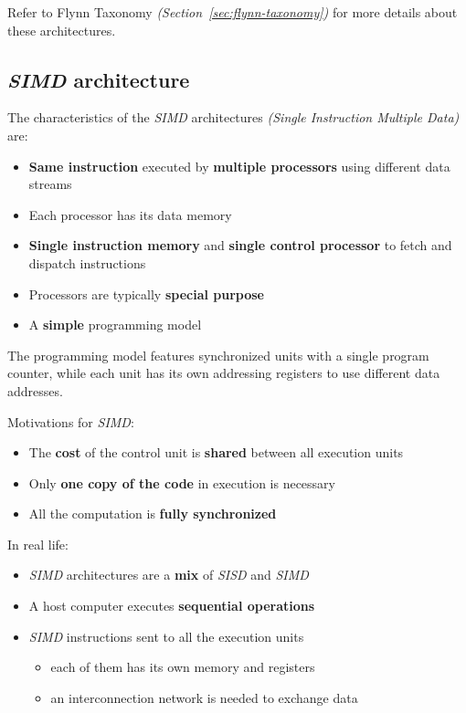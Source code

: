 \documentclass[english]{article}
\begin{document}
Refer to Flynn Taxonomy \textit{(Section~\ref{sec:flynn-taxonomy})} for more details about these architectures.

\subsection{\textit{SIMD} architecture}

The characteristics of the \textit{SIMD} architectures \textit{(Single Instruction Multiple Data)} are:

\begin{itemize}
  \item \textbf{Same instruction} executed by \textbf{multiple processors} using different data streams
  \item Each processor has its data memory
  \item \textbf{Single instruction memory} and \textbf{single control processor} to fetch and dispatch instructions
  \item Processors are typically \textbf{special purpose}
  \item A \textbf{simple} programming model
\end{itemize}

The programming model features synchronized units with a single program counter, while each unit has its own addressing registers to use different data addresses.

\bigskip
Motivations for \textit{SIMD}:

\begin{itemize}
  \item The \textbf{cost} of the control unit is \textbf{shared} between all execution units
  \item Only\textbf{ one copy of the code} in execution is necessary
  \item All the computation is \textbf{fully synchronized}
\end{itemize}

In real life:

\begin{itemize}
  \item \textit{SIMD} architectures are a \textbf{mix} of \textit{SISD} and \textit{SIMD}
  \item A host computer executes \textbf{sequential operations}
  \item \textit{SIMD} instructions sent to all the execution units
        \begin{itemize}
          \item each of them has its own memory and registers
          \item an interconnection network is needed to exchange data
        \end{itemize}
\end{itemize}
\end{document}
